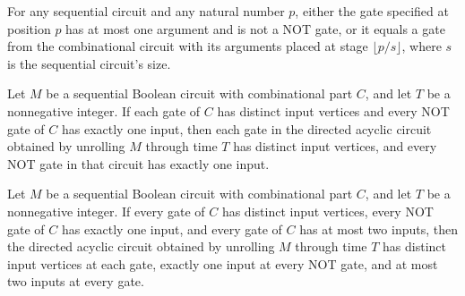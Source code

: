 \begin{theorem}
\label{BoolCircuit.SeqCircuit.unrollGate_cases}
\leanok
{}
For any sequential circuit and any natural number $p$, either the gate specified at
position $p$ has at most one argument and is not a NOT gate, or it equals a gate from
the combinational circuit with its arguments placed at stage $\lfloor p/s\rfloor$, where
$s$ is the sequential circuit's size.
\end{theorem}

\begin{theorem}
\label{BoolCircuit.SeqCircuit.unroll_isWellFormed}
\leanok
{}
Let $M$ be a sequential Boolean circuit with combinational part $C$, and let $T$ be a
nonnegative integer. If each gate of $C$ has distinct input vertices and every NOT gate
of $C$ has exactly one input, then each gate in the directed acyclic circuit obtained by
unrolling $M$ through time $T$ has distinct input vertices, and every NOT gate in that
circuit has exactly one input.
\end{theorem}

\begin{theorem}
\label{BoolCircuit.SeqCircuit.unroll_isFaninTwo}
\leanok
{}
Let $M$ be a sequential Boolean circuit with combinational part $C$, and let $T$ be a
nonnegative integer. If every gate of $C$ has distinct input vertices, every NOT gate of
$C$ has exactly one input, and every gate of $C$ has at most two inputs, then the
directed acyclic circuit obtained by unrolling $M$ through time $T$ has distinct input
vertices at each gate, exactly one input at every NOT gate, and at most two inputs at
every gate.
\end{theorem}

